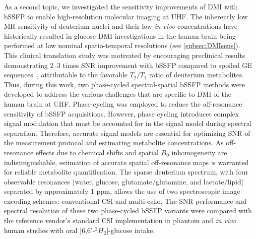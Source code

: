 As a second topic, we investigated the sensitivity improvements of \gls{DMI} with \gls{bSSFP} to enable high-resolution molecular imaging at \gls{UHF}. The inherently low MR sensitivity of deuterium nuclei and their low \textit{in vivo} concentrations have historically resulted in glucose-\gls{DMI} investigations in the human brain being performed at low nominal spatio-temporal resolutions (see \cref{subsec:DMIsens}). This clinical translation study was motivated by encouraging preclinical results demonstrating 2--3 times SNR improvement with \gls{bSSFP} compared to spoiled \gls{GE} sequences~\cite{petersImprovingDeuteriumMetabolic2021,montraziHighsensitivityDeuteriumMetabolic2023}, attributable to the favorable $T_2/T_1$ ratio of deuterium metabolites.  
Thus, during this work, two phase-cycled spectral-spatial \gls{bSSFP} methods were developed to address the various challenges that are specific to \gls{DMI} of the human brain at \gls{UHF}. Phase-cycling was employed to reduce the off-resonance sensitivity of \gls{bSSFP} acquisitions. However, phase cycling introduces complex signal modulation that must be accounted for in the signal model during spectral separation. Therefore, accurate signal models are essential for optimizing \gls{SNR} of the measurement protocol and estimating metabolite concentrations. As off-resonance effects due to chemical shifts and spatial $B_0$ inhomogeneity are indistinguishable, estimation of accurate spatial off-resonance maps is warranted for reliable metabolite quantification. The sparse deuterium spectrum, with four observable resonances (water, glucose, glutamate/glutamine, and lactate/lipid) separated by approximately 1 ppm, allows the use of two spectroscopic image encoding schemes: conventional \gls{CSI} and multi-echo. The SNR performance and spectral resolution of these two phase-cycled \gls{bSSFP} variants were compared with the reference vendor’s standard \gls{CSI} implementation in phantom and \textit{in vivo} human studies with oral [6,6'-$^2H_2$]-glucose intake.